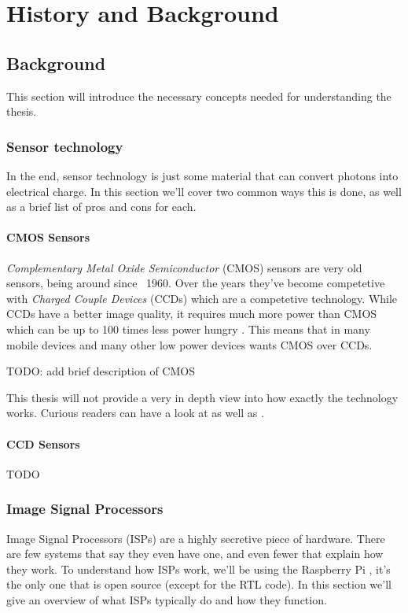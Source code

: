 \chapter{History and Background\label{history}}
\section{Background}
This section will introduce the necessary concepts needed for understanding the
thesis.

\subsection{Sensor technology}
In the end, sensor technology is just some material that can convert photons
into electrical charge. In this section we'll cover two common ways this is
done, as well as a brief list of pros and cons for each.

\subsubsection{CMOS Sensors}
\textit{Complementary Metal Oxide Semiconductor} (CMOS) sensors are very old
sensors, being around since ~1960. Over the years they've become competetive
with \textit{Charged Couple Devices} (CCDs) which are a competetive technology.
While CCDs have a better image quality, it requires much more power than CMOS
which can be up to 100 times less power hungry \cite{CMOSReview}. This means
that in many mobile devices and many other low power devices wants CMOS
over CCDs.

TODO: add brief description of CMOS

This thesis will not provide a very in depth view into how exactly the
technology works. Curious readers can have a look at \cite{CMOSReview} as well
as \cite{ieeeCMOS}.

\subsubsection{CCD Sensors}
TODO

\subsection{Image Signal Processors}
Image Signal Processors (ISPs) are a highly secretive piece of hardware. There
are few systems that say they even have one, and even fewer that explain how
they work. To understand how ISPs work, we'll be using the Raspberry Pi
\cite{raspberrypiTuningGuide}, it's the only one that is open source (except
for the RTL code). In this section we'll give an overview of what ISPs
typically do and how they function.

